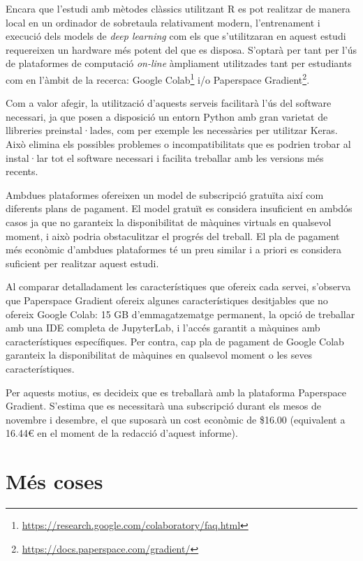\documentclass[CAT,BIB]{TFUOC}%
\begin{document}
            Encara que l'estudi amb mètodes clàssics utilitzant \textsf{R} es pot realitzar de manera local en un ordinador de sobretaula relativament modern, l'entrenament i execució dels models de \textit{deep learning} com els que s'utilitzaran en aquest estudi requereixen un hardware més potent del que es disposa. S'optarà per tant per l'ús de plataformes de computació \textit{on-line} àmpliament utilitzades tant per estudiants com en l'àmbit de la recerca: Google Colab\footnote{\url{https://research.google.com/colaboratory/faq.html}} i/o Paperspace Gradient\footnote{\url{https://docs.paperspace.com/gradient/}}.

            Com a valor afegir, la utilització d'aquests serveis facilitarà l'ús del software necessari, ja que posen a disposició un entorn Python amb gran varietat de llibreries preinstal·lades, com per exemple les necessàries per utilitzar Keras. Això elimina els possibles problemes o incompatibilitats que es podrien trobar al instal·lar tot el software necessari i facilita treballar amb les versions més recents.

            Ambdues plataformes ofereixen un model de subscripció gratuïta així com diferents plans de pagament. El model gratuït es considera insuficient en ambdós casos ja que no garanteix la disponibilitat de màquines virtuals en qualsevol moment, i això podria obstaculitzar el progrés del treball. El pla de pagament més econòmic d'ambdues plataformes té un preu similar i a priori es considera suficient per realitzar aquest estudi.

            Al comparar detalladament les característiques que ofereix cada servei, s'observa que Paperspace Gradient ofereix algunes característiques desitjables que no ofereix Google Colab: 15 GB d'emmagatzematge permanent, la opció de treballar amb una IDE completa de JupyterLab, i l'accés garantit a màquines amb característiques específiques. Per contra, cap pla de pagament de Google Colab garanteix la disponibilitat de màquines en qualsevol moment o les seves característiques.

            Per aquests motius, es decideix que es treballarà amb la plataforma Paperspace Gradient. S'estima que es necessitarà una subscripció durant els mesos de novembre i desembre, el que suposarà un cost econòmic de \$16.00 (equivalent a 16.44€ en el moment de la redacció d'aquest informe).

    \section{Més coses}
    \label{s:mes}
\end{document}
